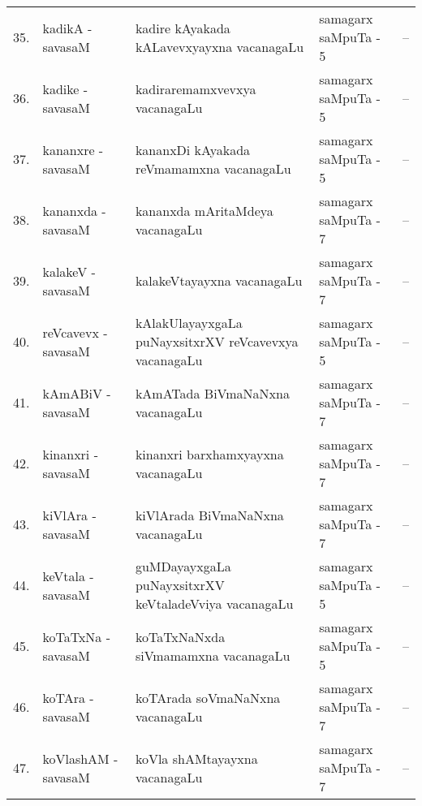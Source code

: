 {\renewcommand{\arraystretch}{1.3}
\begin{longtable}{rl>{\raggedright}p{5.5cm}lc}
\hline
\endfirsthead
\hline
\endhead
\hline
\endfoot
\endlastfoot
35. &  kadikA - savasaM &  kadire kAyakada kALavevxyayxna vacanagaLu & samagarx saMpuTa - 5 & --\\
36. &  kadike - savasaM &  kadiraremamxvevxya vacanagaLu & samagarx saMpuTa - 5 & --\\
37. &  kananxre - savasaM & kananxDi kAyakada reVmamamxna vacanagaLu & samagarx saMpuTa - 5 & --\\
38. &  kananxda - savasaM & kananxda mAritaMdeya vacanagaLu & samagarx saMpuTa - 7 & --\\
39. &  kalakeV - savasaM & kalakeVtayayxna vacanagaLu & samagarx saMpuTa - 7 & --\\
40. &  reVcavevx - savasaM & kAlakUlayayxgaLa puNayxsitxrXV reVcavevxya vacanagaLu & samagarx saMpuTa - 5 & --\\
41. &  kAmABiV - savasaM & kAmATada BiVmaNaNxna vacanagaLu & samagarx saMpuTa - 7 & --\\
42. &  kinanxri - savasaM & kinanxri barxhamxyayxna vacanagaLu & samagarx saMpuTa - 7 & --\\
43. &  kiVlAra - savasaM & kiVlArada BiVmaNaNxna vacanagaLu & samagarx saMpuTa - 7 & --\\
44. &  keVtala - savasaM & guMDayayxgaLa puNayxsitxrXV keVtaladeVviya vacanagaLu & samagarx saMpuTa - 5 & --\\
45. &  koTaTxNa - savasaM & koTaTxNaNxda siVmamamxna vacanagaLu & samagarx saMpuTa - 5 & --\\
46. &  koTAra - savasaM & koTArada soVmaNaNxna vacanagaLu & samagarx saMpuTa - 7 & --\\
47. &  koVlashAM - savasaM & koVla shAMtayayxna vacanagaLu & samagarx saMpuTa - 7 & --\\
\hline
\end{longtable}}

